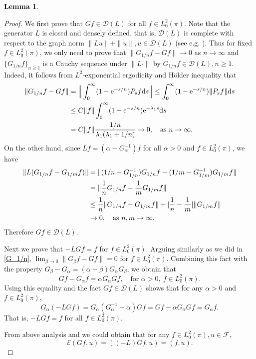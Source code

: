 \documentclass[12pt,reqno]{article}
\newtheorem{lem}[thm]{Lemma}
\theoremstyle{definition}
\theoremstyle{remark}
\theoremstyle{example}
\numberwithin{equation}{section}
\newcommand{\scr}[1]{\mathscr #1}
\def\d{\mathrm{d}}
\def\e{\scr E}
\def\d{\rm d}
\def\bg{\begin}
\def\be{\bg{equation}}
\def\de{\end{equation}}
\def\lb{\label}
\def\fr{\frac}
\def\alp{\alpha}
\def\bt{\beta}
\def\lmd{\lambda}
\def\rar{\rightarrow}
\def\d{{\mbox{\rm d}}}
\begin{document}
{\begin{lem}
\end{lem}
\begin{proof}
We first prove that  $Gf\in \scr{D}(L)$ for all $f\in L^2_0(\pi)$.
Note that the generator $L$ is closed and densely defined, that is, $\scr{D}(L)$ is complete with respect to the graph norm $\|Lu\|+\|u\|,u\in\scr{D}(L)$ (see e.g. \cite[Chapter 1, Proposition 1.10]{MR92}). Thus for fixed $f\in L^2_0(\pi)$, we only need to prove that $\|G_{1/n}f-Gf\|\rightarrow 0$ as $n\rightarrow \infty$ and $\{G_{1/n}f\}_{n\geq 1}$ is a Cauchy sequence under $\|L\cdot\|$ by $G_{1/n}f\in \scr{D}(L),n\geq1$. Indeed, it follows from $L^2$-exponential ergodicity and H\"older inequality that
\be\lb{G_1/n}
\aligned
\|G_{1/n} f-Gf\|&= \Big\|\int_0^\infty(1-{\rm e}^{-s/n})P_sf\d s\Big\|
\leq\int_0^\infty (1-{\rm e}^{-s/n})\| P_sf\|\d s\\
&\leq C\|f\|\int_0^\infty(1-{\rm e}^{-s/n}){\rm e}^{-\lambda_1 s}\d s\\
&= C\|f\|\fr{1/n}{\lmd_1(\lmd_1+1/n)}\rightarrow 0,\quad \text{as }n\rightarrow \infty.
\endaligned
\de
On the other hand, since $Lf=(\alpha-G_\alpha^{-1})f$ for all $\alpha>0$ and $f\in L^2_0(\pi)$, we have
$$
\aligned
\|L(G_{1/n}f-G_{1/m}f)\|&=\|(1/n-G_{1/n}^{-1})G_{1/n}f-(1/m-G_{1/m}^{-1})G_{1/m}f\|\\
&=\|\frac{1}{n}G_{1/n}f-\frac{1}{m}G_{1/m}f\|\\
&\leq \frac{1}{n}\|G_{1/n}f-G_{1/m}f\|+|\frac{1}{n}-\frac{1}{m}|\|G_{1/m}f\|\\
&\rightarrow 0,\quad \text{as }n,m\rightarrow\infty.
\endaligned
$$
Therefore $Gf\in \scr{D}(L)$.

Next we prove that $-LGf=f$ for $f\in L^2_0(\pi)$. Arguing similarly as we did in \eqref{G_1/n}, $\lim_{\bt\rar0}\|G_\bt f-Gf\|=0$ for  $f\in L^2_0(\pi)$. Combining this fact with the property $G_\beta-G_\alpha=(\alp-\bt)G_\alpha G_\beta$, we obtain that
$$
Gf-G_\alpha f=\alpha G_\alpha Gf,\quad \text{for }\alpha>0 ,\ f\in L^2_0(\pi).
$$
Using this equality and the fact $Gf\in \scr{D}(L)$ shows that for any $\alpha>0$ and $ f\in L^2_0(\pi)$,
$$
G_\alpha(-LGf)=G_\alpha(G_\alpha^{-1}-\alpha)Gf=Gf-\alpha G_\alpha Gf=G_\alpha f.
$$
That is, $-LGf=f$ for all $f\in L_0^2(\pi)$.

From above analysis and \cite[Chapter 1, Corollary 2.10]{MR92} we could obtain that for any $f\in L^2_0(\pi),u\in\scr{F}$,
$$
\e(Gf,u)=((-L)Gf,u)=( f,u).
$$
\end{proof}


}
\end{document}
